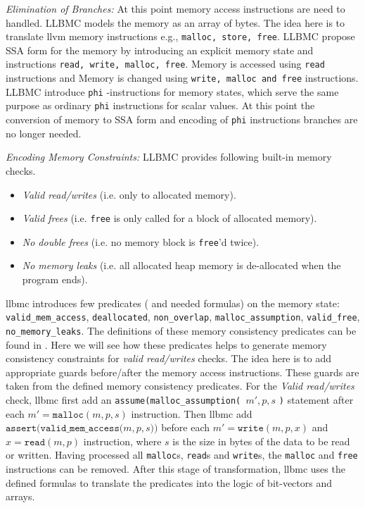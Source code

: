 \documentclass[14pt]{article}
\begin{document}
\par \textit{Elimination of Branches:} At this point memory access instructions are need to handled. LLBMC models the memory as an array of bytes. The idea here is to translate llvm memory instructions e.g.,  \texttt{malloc, store, free}. LLBMC propose SSA form for the memory by introducing an explicit memory state and instructions \texttt{read, write, malloc, free}. Memory is accessed using \texttt{read} instructions and Memory is changed using \texttt{write, malloc and free} instructions. LLBMC introduce \texttt{phi} -instructions for memory states, which serve the same purpose as ordinary \texttt{phi} instructions for scalar values. At this point the conversion of memory to SSA form and  encoding of \texttt{phi} instructions branches are no longer needed.

\par \textit{Encoding Memory Constraints:} LLBMC provides following built-in memory checks. 
\begin{itemize}
  \item \textit{Valid read/writes } (i.e. only to allocated memory).
  \item \textit{Valid frees} (i.e. \texttt{free} is only called for a block of allocated memory).
  \item \textit{No double frees} (i.e. no memory block is  \texttt{free}'d twice).
  \item \textit{No memory leaks} (i.e. all allocated heap memory is de-allocated when the program ends).
\end{itemize}
llbmc introduces few predicates ( and needed formulas) on the memory state: 
  \texttt{valid\_mem\_access},
  \texttt{deallocated},
  \texttt{non\_overlap},
  \texttt{malloc\_assumption},
  \texttt{valid\_free},
  \texttt{no\_memory\_leaks}. The definitions of these memory consistency predicates can be found in \cite{llbmc2}. Here we will see how these predicates helps to generate memory consistency constraints for \textit{valid read/writes } checks. The idea here is to add appropriate guards before/after the memory access instructions. These guards are taken from the defined memory consistency predicates. For the \textit{Valid read/writes } check, llbmc first add an \texttt{assume(malloc\_assumption( }\(m', p, s\) \texttt{)} statement after each \(m' = \texttt{malloc}(m, p, s)\) instruction. Then llbmc add \(\texttt{assert(valid\_mem\_access(}m, p, s\texttt{))}\) before each \( m' = \texttt{write}(m, p, x)\) and \( x = \texttt{read}(m, p)\) instruction, where  \(s\) is the size in bytes of the data to be read or written. Having processed all \texttt{malloc}s, \texttt{read}s and \texttt{write}s, the \texttt{malloc} and \texttt{free} instructions can be removed. After this stage of transformation, llbmc uses the defined formulas to translate the predicates into the logic of bit-vectors and arrays.
  
\end{document}
